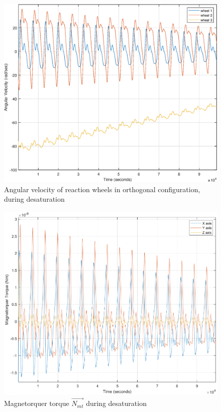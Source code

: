 
		
%

\begin{figure}[H]
	\centering
	\includegraphics[width=0.8\linewidth]{figures/desaturation2}
	\caption{Angular velocity of reaction wheels in orthogonal configuration, during desaturation}
	\label{fig:desatspeed}
\end{figure}

\begin{figure}[H]
	\centering
	\includegraphics[width=0.9\linewidth]{figures/desat_Nmt}
	\caption{Magnetorquer torque $\vec{N_{mt}}$ during desaturation}
	\label{fig:desatNmt}
\end{figure}